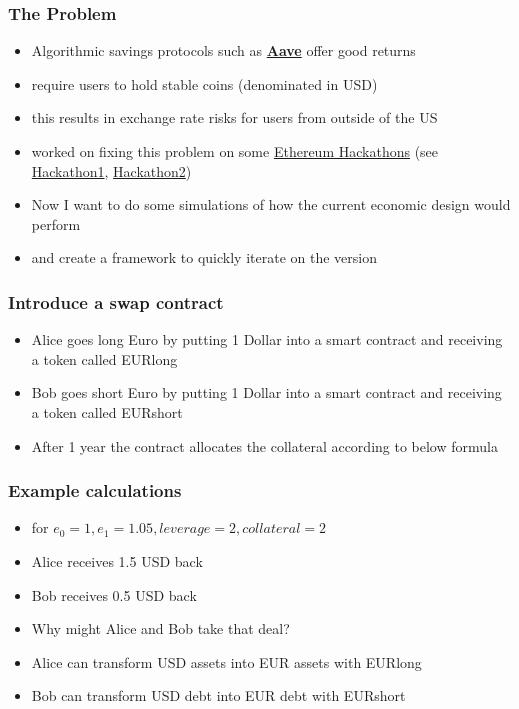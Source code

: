 \documentclass[11pt]{beamer}
\begin{document}
\begin{frame}[t]
    \frametitle{The Problem}
    \begin{itemize}
        \item Algorithmic savings protocols such as \href{https://app.aave.com/}{\bf{Aave}} offer good returns
        \item require users to hold stable coins (denominated in USD)
        \item this results in exchange rate risks for users from outside of the US
        \item worked on fixing this problem on some \href{https://ethglobal.online/}{Ethereum Hackathons} (see
        \href{https://github.com/SchickMarkus/Dollar_Hedge}{Hackathon1}, \href{https://github.com/PhilKlae/CortexHedge}{Hackathon2})
        \item Now I want to do some simulations of how the current economic design would perform
        \item and create a framework to quickly iterate on the version
    \end{itemize}
    \note{~}
\end{frame}


\begin{frame}[t]
    \frametitle{Introduce a swap contract}
    \begin{itemize}
        \item Alice goes long Euro by putting 1 Dollar into a smart contract and receiving a token called EURlong
        \item Bob goes short Euro by putting 1 Dollar into a smart contract and receiving a token called EURshort
        \item After 1 year the contract allocates the collateral according to below formula
    \end{itemize}
    

    \note{~}
\end{frame}

\begin{frame}[t]
    \frametitle{Example calculations}
    \begin{itemize}
        \item for $e_0 = 1, e_1 = 1.05, leverage = 2, collateral = 2$
        \item Alice receives 1.5 USD back
        \item Bob receives 0.5 USD back
        \item Why might Alice and Bob take that deal?
        \item Alice can transform USD assets into EUR assets with EURlong
        \item Bob can transform USD debt into EUR debt with EURshort
    \end{itemize}

    \note{~}
\end{frame}
\end{document}
